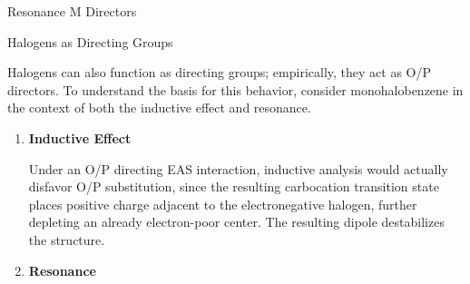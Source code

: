 \begin{core}[label=core:rm_director]{Resonance M Directors}
      \end{core}

      \begin{core}{Halogens as Directing Groups}

        Halogens can also function as directing groups; empirically, they act as O/P directors. To understand the basis for this behavior, consider monohalobenzene in the context of both the inductive effect and resonance.

        \vspace{-0.4cm}

        \begin{enumerate}

          \item \textbf{Inductive Effect}


          Under an O/P directing EAS interaction, inductive analysis would actually disfavor O/P substitution, since the resulting carbocation transition state places positive charge adjacent to the electronegative halogen, further depleting an already electron-poor center. The resulting dipole destabilizes the structure.

          \item \textbf{Resonance}


\end{enumerate}
\end{core}

